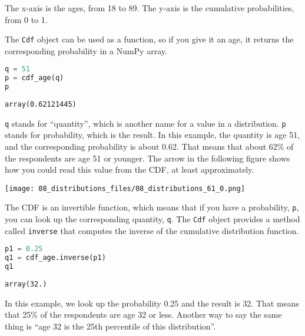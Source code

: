 The x-axis is the ages, from 18 to 89. The y-axis is the cumulative
probabilities, from 0 to 1.

\pagebreak

The \passthrough{\lstinline!Cdf!} object can
be used as a function, so if you give it an age, it returns the
corresponding probability in a NumPy array.

\begin{lstlisting}[language=Python,style=source]
q = 51
p = cdf_age(q)
p
\end{lstlisting}

\begin{lstlisting}[style=output]
array(0.62121445)
\end{lstlisting}

\passthrough{\lstinline!q!} stands for ``quantity'', which is another
name for a value in a distribution. \passthrough{\lstinline!p!} stands
for probability, which is the result. In this example, the quantity is
age 51, and the corresponding probability is about 0.62. That means that
about 62\% of the respondents are age 51 or younger. The arrow in the
following figure shows how you could read this value from the CDF, at
least approximately.



\begin{center}
\texttt{[image: 08\_distributions\_files/08\_distributions\_61\_0.png]}
\end{center}

The CDF is an invertible function, which means that if you have a
probability, \passthrough{\lstinline!p!}, you can look up the
corresponding quantity, \passthrough{\lstinline!q!}. The
\passthrough{\lstinline!Cdf!} object provides a method called
\passthrough{\lstinline!inverse!} that computes the inverse of the
cumulative distribution function.

\begin{lstlisting}[language=Python,style=source]
p1 = 0.25
q1 = cdf_age.inverse(p1)
q1
\end{lstlisting}

\begin{lstlisting}[style=output]
array(32.)
\end{lstlisting}

In this example, we look up the probability 0.25 and the result is 32.
That means that 25\% of the respondents are age 32 or less. Another way
to say the same thing is ``age 32 is the 25th percentile of this
distribution''.

